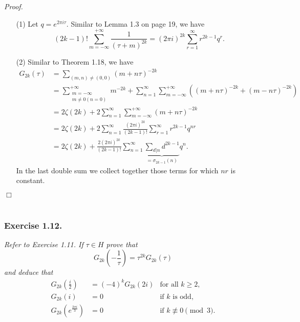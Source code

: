 \documentclass{article}
\begin{document}
\emph{Proof.}
\begin{enumerate}
\item[(1)]
  Let $q = e^{2 \pi i \tau}$.
  Similar to Lemma 1.3 on page 19, we have
  \[
    (2k-1)! \sum_{m=-\infty}^{+\infty} \frac{1}{(\tau+m)^{2k}}
    = (2 \pi i)^{2k} \sum_{r=1}^{\infty} r^{2k-1} q^r.
  \]

\item[(2)]
  Similar to Theorem 1.18, we have
  \begin{align*}
    G_{2k}(\tau)
    &= \sum_{(m,n) \neq (0,0)} (m+n\tau)^{-2k} \\
    &= \sum_{\substack{m=-\infty \\ m \neq 0 (n = 0)}}^{+\infty} m^{-2k}
      + \sum_{n=1}^{\infty} \sum_{m=-\infty}^{+\infty} ((m+n\tau)^{-2k} + (m-n\tau)^{-2k}) \\
    &= 2 \zeta(2k)
      + 2 \sum_{n=1}^{\infty} \sum_{m=-\infty}^{+\infty} (m+n\tau)^{-2k} \\
    &= 2 \zeta(2k)
      + 2 \sum_{n=1}^{\infty} \frac{(2\pi i)^{2k}}{(2k-1)!}
        \sum_{r=1}^{\infty} r^{2k-1} q^{nr} \\
    &= 2 \zeta(2k)
      + \frac{2(2\pi i)^{2k}}{(2k-1)!} \sum_{n=1}^{\infty}
        \underbrace{\sum_{d|n} d^{2k-1}}_{= \sigma_{2k-1}(n)} q^{n}.
  \end{align*}
  In the last double sum we collect together those terms for which $nr$ is constant.
\end{enumerate}
$\Box$ \\\\






\subsubsection*{Exercise 1.12.}
\emph{Refer to Exercise 1.11. If $\tau \in H$ prove that
\[
  G_{2k}\left(-\frac{1}{\tau}\right) = \tau^{2k} G_{2k}(\tau)
\]
and deduce that
\begin{align*}
  G_{2k}\left(\frac{i}{2}\right) &= (-4)^k G_{2k}(2i)
    &\text{for all $k \geq 2$}, \\
  G_{2k}(i) &= 0
    &\text{if $k$ is odd}, \\
  G_{2k}(e^{\frac{2\pi i}{3}}) &= 0
    &\text{if $k \not\equiv 0 \pmod{3}$}.
\end{align*}}
\end{document}
